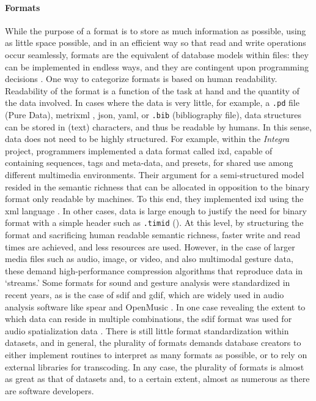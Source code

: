 {	\paragraph{Formats}
	While the purpose of a format is to store as much information as possible, using as little space possible, and in an efficient way so that read and write operations occur seamlessly, formats are the equivalent of database models within files: they can be implemented in endless ways, and they are contingent upon programming decisions \parencite[8]{Ste12:MP3}. One way to categorize formats is based on human readability. Readability of the format is a function of the task at hand and the quantity of the data involved. In cases where the data is very little, for example, a \texttt{.pd} file (Pure Data), \gls{metrixml} \parencite{Amatriain/2004/phdthesis}, \gls{json}, \gls{yaml}, or \texttt{.bib} (\latex bibliography file), data structures can be stored in (text) characters, and thus be readable by humans. In this sense, data does not need to be highly structured. For example, within the \textit{Integra} project, programmers implemented a data format called \gls{ixd}, capable of containing sequences, tags and meta-data, and presets, for shared use among different multimedia environments. Their argument for a semi-structured model resided in the semantic richness that can be allocated in opposition to the binary format only readable by machines. To this end, they implemented \gls{ixd} using the \gls{xml} language \parencite{icmc/bbp2372.2009.012}. In other cases, data is large enough to justify the need for binary format with a simple header such as \texttt{.timid} (). At this level, by structuring the format and sacrificing human readable semantic richness, faster write and read times are achieved, and less resources are used. However, in the case of larger media files such as audio, image, or video, and also multimodal gesture data, these demand high-performance compression algorithms that reproduce data in `streams.' Some formats for sound and gesture analysis were standardized in recent years, as is the case of \gls{sdif} and \gls{gdif}, which are widely used in audio analysis software like \gls{spear} and OpenMusic \parencite{icmc/bbp2372.2004.004,kristian_nymoen_2011_849865}. In one case revealing the extent to which data can reside in multiple combinations, the \gls{sdif} format was used for audio spatialization data \parencite{icmc/bbp2372.2004.004}. There is still little format standardization within datasets, and in general, the plurality of formats demands database creators to either implement routines to interpret as many formats as possible, or to rely on external libraries for transcoding. In any case, the plurality of formats is almost as great as that of datasets and, to a certain extent, almost as numerous as there are software developers.

}
